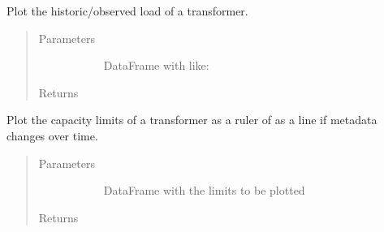 \documentclass[letterpaper,10pt,english]{sphinxmanual}
\begin{document}

\begin{fulllineitems}
\label{\detokenize{autoapi/src/plot/altair/index:src.plot.altair.plot_observed}}
Plot the historic/observed load of a transformer.
\begin{quote}\begin{description}
\item[{Parameters}] \leavevmode\begin{description}
\item[{}] \leavevmode{[}\sphinxcode{\sphinxupquote{pd.DataFrame}}{]}
DataFrame with like:

\end{description}

\item[{Returns}] \leavevmode\begin{description}
\item[{ }] \leavevmode
\end{description}

\end{description}\end{quote}

\end{fulllineitems}


\begin{fulllineitems}
\label{\detokenize{autoapi/src/plot/altair/index:src.plot.altair.plot_limits}}
Plot the capacity limits of a transformer as a ruler of as a line if metadata changes over time.
\begin{quote}\begin{description}
\item[{Parameters}] \leavevmode\begin{description}
\item[{}] \leavevmode{[}\sphinxcode{\sphinxupquote{pd.DataFrame}}{]}
DataFrame with the limits to be plotted

\end{description}

\item[{Returns}] \leavevmode\begin{description}
\item[{ }] \leavevmode
\end{description}

\end{description}\end{quote}

\end{fulllineitems}
\end{document}

